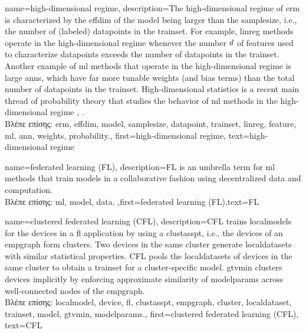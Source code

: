 {name={high-dimensional regime}, 
	description={The 
		high-dimensional regime of \gls{erm} is characterized by the \gls{effdim} of the \gls{model} 
		being larger than the \gls{samplesize}, i.e., the number of (labeled) \gls{datapoint}s in the \gls{trainset}. 
		For example, \gls{linreg} methods operate in the high-dimensional regime whenever the number $d$ of \gls{feature}s 
		used to characterize \gls{datapoint}s exceeds the number of \gls{datapoint}s in the \gls{trainset}. 
		Another example of \gls{ml} methods that operate in the high-dimensional regime is large \gls{ann}s, which have 
		far more tunable \gls{weights} (and bias terms) than the total number of \gls{datapoint}s in the \gls{trainset}. 
		High-dimensional statistics is a recent main thread of \gls{probability} theory that studies the 
		behavior of \gls{ml} methods in the high-dimensional regime \cite{Wain2019}, \cite{BuhlGeerBook}.\\
		\foreignlanguage{greek}{Βλέπε επίσης:} \gls{erm}, \gls{effdim}, \gls{model}, \gls{samplesize}, \gls{datapoint}, \gls{trainset}, \gls{linreg}, \gls{feature}, \gls{ml}, \gls{ann}, \gls{weights}, \gls{probability}.},
   first={high-dimensional regime},
   text={high-dimensional regime}
}
	 
{name={federated learning (FL)}, 
	description={FL 
		is an umbrella term for \gls{ml} methods that train \gls{model}s in a collaborative 
		fashion using decentralized \gls{data} and computation.\\
		\foreignlanguage{greek}{Βλέπε επίσης:} \gls{ml}, \gls{model}, \gls{data}.
		},first={federated learning (FL)},text={FL} }
	
{name={clustered federated learning (CFL)}, 
	description={CFL trains \gls{localmodel}s for the 
 		\gls{device}s in a \gls{fl} application by using a \gls{clustasspt}, i.e., the \gls{device}s 
 		of an \gls{empgraph} form \gls{cluster}s. Two \gls{device}s in the same \gls{cluster} generate 
 		\gls{localdataset}s with similar statistical properties. CFL pools the \gls{localdataset}s of \gls{device}s 
 		in the same \gls{cluster} to obtain a \gls{trainset} for a \gls{cluster}-specific \gls{model}. 
 		\Gls{gtvmin} clusters \gls{device}s implicitly by enforcing approximate similarity of \gls{modelparams} 
 		across well-connected nodes of the \gls{empgraph}.\\
	\foreignlanguage{greek}{Βλέπε επίσης:}  \gls{localmodel}, \gls{device}, \gls{fl}, \gls{clustasspt}, \gls{empgraph}, \gls{cluster}, \gls{localdataset}, \gls{trainset}, \gls{model}, \gls{gtvmin}, \gls{modelparams}.}, 
	first={clustered federated learning (CFL)},
	text={CFL} }
	
